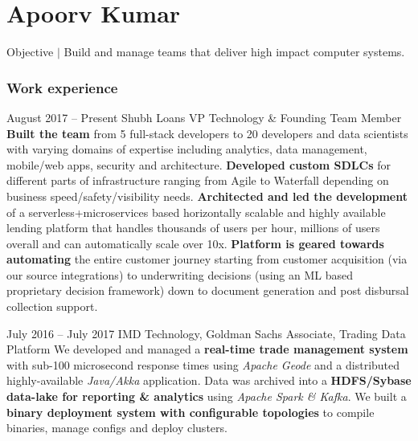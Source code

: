 \documentclass{tccv}
\begin{document}
\part{Apoorv Kumar}
	 {\selectfont\large Objective $\vert$ \selectfont\large Build and manage teams that deliver high impact computer systems.}
     
\section{Work experience}


\begin{eventlist}
\item{August 2017 -- Present}
	 {Shubh Loans}
	 {VP Technology \& Founding Team Member}
\textbf{Built the team} from 5 full-stack developers to 20 developers and data scientists with varying domains of expertise including analytics, data management, mobile/web apps, security and architecture.\newline
\textbf{Developed custom SDLCs} for different parts of infrastructure ranging from Agile to Waterfall depending on business speed/safety/visibility needs.
\textbf{Architected and led the development} of a serverless+microservices based horizontally scalable and highly available lending platform that handles thousands of users per hour, millions of users overall and can automatically scale over 10x.\newline
\textbf{Platform is geared towards automating} the entire customer journey starting from customer acquisition (via our source integrations) to underwriting decisions (using an ML based proprietary decision framework) down to document generation and post disbursal collection support.\newline


\item{July 2016 -- July 2017}
     {IMD Technology, Goldman Sachs}
     {Associate, Trading Data Platform}
     We developed and managed a \textbf{real-time trade management system} with sub-100 microsecond response times using \textit{Apache Geode} and a distributed highly-available \textit{Java/Akka} application. Data was archived into a \textbf{HDFS/Sybase data-lake for reporting \& analytics} using \textit{Apache Spark \& Kafka}. \newline
     We built a \textbf{binary deployment system with configurable topologies} to compile binaries, manage configs and deploy clusters. 



\end{eventlist}
\end{document}
